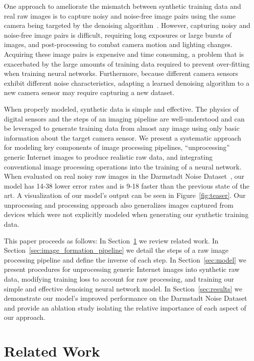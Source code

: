 \documentclass[10pt,twocolumn,letterpaper]{article}
\begin{document}
One approach to ameliorate the mismatch between synthetic training data and real raw images is to capture noisy and noise-free image pairs using the same camera being targeted by the denoising algorithm~\cite{SIDD, chen2018cvpr, schwartz2018itip}. However, capturing noisy and noise-free image pairs is difficult, requiring long exposures or large bursts of images, and post-processing to combat camera motion and lighting changes. Acquiring these image pairs is expensive and time consuming, a problem that is exacerbated by the large amounts of training data required to prevent over-fitting when training neural networks. Furthermore, because different camera sensors exhibit different noise characteristics, adapting a learned denoising algorithm to a new camera sensor may require capturing a new dataset.

When properly modeled, synthetic data is simple and effective. The physics of digital sensors and the steps of an imaging pipeline are well-understood and can be leveraged to generate training data from almost any image using only basic information about the target camera sensor. We present a systematic approach for modeling key components of image processing pipelines, ``unprocessing'' generic Internet images to produce realistic raw data, and integrating conventional image processing operations into the training of a neural network. 
When evaluated on real noisy raw images in the Darmstadt Noise Dataset~\cite{plotz2017cvpr}, our model has 14-38 lower error rates and is 9-18 faster than the previous state of the art. A visualization of our model's output can be seen in Figure~\ref{fig:teaser}. Our unprocessing and processing approach also generalizes images captured from devices which were not explicitly modeled when generating our synthetic training data.


This paper proceeds as follows: In Section~\ref{sec:related} we review related work.
In Section~\ref{sec:image_formation_pipeline} we detail the steps of a raw image processing pipeline and define the inverse of each step.
In Section~\ref{sec:model} we present procedures for unprocessing generic Internet images into synthetic raw data, modifying training loss to account for raw processing, and training our simple and effective denoising neural network model.
In Section~\ref{sec:results} we demonstrate our model's improved performance on the Darmstadt Noise Dataset~\cite{plotz2017cvpr} and provide an ablation study isolating the relative importance of each aspect of our approach.

\section{Related Work}
\label{sec:related}
\end{document}

